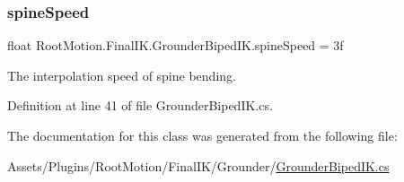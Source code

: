 \subsubsection{\texorpdfstring{spine\+Speed}{spineSpeed}}
{\footnotesize\ttfamily float Root\+Motion.\+Final\+I\+K.\+Grounder\+Biped\+I\+K.\+spine\+Speed = 3f}



The interpolation speed of spine bending. 



Definition at line 41 of file Grounder\+Biped\+I\+K.\+cs.



The documentation for this class was generated from the following file\+:\begin{DoxyCompactItemize}
\item 
Assets/\+Plugins/\+Root\+Motion/\+Final\+I\+K/\+Grounder/\mbox{\hyperlink{_grounder_biped_i_k_8cs}{Grounder\+Biped\+I\+K.\+cs}}\end{DoxyCompactItemize}

